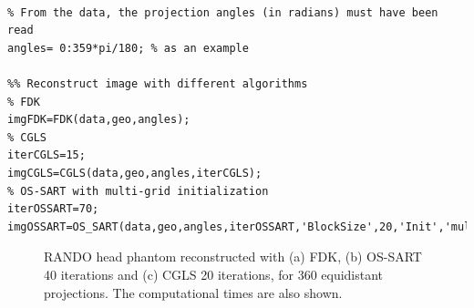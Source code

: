 \begin{lstlisting}[style=Matlab-editor,
basicstyle=\scriptsize,
caption= RANDO head data reconstruction,
label={cs:randohead},
frame = single
]
% Define Geometry & load data

% From the data, the projection angles (in radians) must have been read
angles= 0:359*pi/180; % as an example 

%% Reconstruct image with different algorithms
% FDK
imgFDK=FDK(data,geo,angles);
% CGLS
iterCGLS=15;
imgCGLS=CGLS(data,geo,angles,iterCGLS);
% OS-SART with multi-grid initialization
iterOSSART=70; 
imgOSSART=OS_SART(data,geo,angles,iterOSSART,'BlockSize',20,'Init','multigrid');

\end{lstlisting}





\begin{figure}
\centering
{}

\caption{\label{fig:RANDOTIGRE} RANDO head phantom reconstructed with (a) FDK, (b) OS-SART 40 iterations and (c) CGLS 20 iterations, for 360 equidistant projections. The computational times are also shown.} 
\end{figure}



